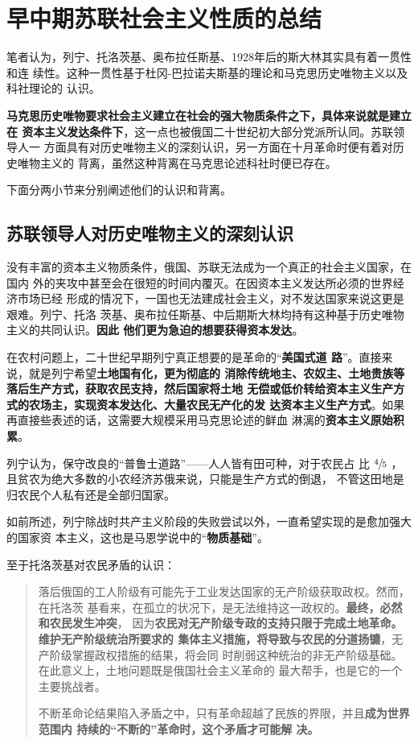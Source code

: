\section{早中期苏联社会主义性质的总结}

笔者认为，列宁、托洛茨基、奥布拉任斯基、1928年后的斯大林其实具有着一贯性和连
续性。这种一贯性基于杜冈-巴拉诺夫斯基的理论和马克思历史唯物主义以及科社理论的
认识。

\textbf{马克思历史唯物要求社会主义建立在社会的强大物质条件之下，具体来说就是建立在
  资本主义发达条件下}，这一点也被俄国二十世纪初大部分党派所认同。苏联领导人一
方面具有对历史唯物主义的深刻认识，另一方面在十月革命时便有着对历史唯物主义的
背离，虽然这种背离在马克思论述科社时便已存在。

下面分两小节来分别阐述他们的认识和背离。

\subsection{苏联领导人对历史唯物主义的深刻认识}

没有丰富的资本主义物质条件，俄国、苏联无法成为一个真正的社会主义国家，在国内
外的夹攻中甚至会在很短的时间内覆灭。在因资本主义发达所必须的世界经济市场已经
形成的情况下，一国也无法建成社会主义，对不发达国家来说这更是艰难。列宁、托洛
茨基、奥布拉任斯基、中后期斯大林均持有这种基于历史唯物主义的共同认识。\textbf{因此
  他们更为急迫的想要获得资本发达}。

在农村问题上，二十世纪早期列宁真正想要的是革命的“\textbf{美国式道
  路}”\cite{chenxintianamerica}。直接来说，就是列宁希望\textbf{土地国有化，更为彻底的
  消除传统地主、农奴主、土地贵族等落后生产方式，获取农民支持，然后国家将土地
  无偿或低价转给资本主义生产方式的农场主，实现资本发达化、大量农民无产化的发
  达资本主义生产方式}。如果再直接些表述的话，这需要大规模采用马克思论述的鲜血
淋漓的\textbf{资本主义原始积累}。

列宁认为，保守改良的“普鲁士道路”——人人皆有田可种，对于农民占
比 $\sfrac{4}{5}$ ，且贫农为绝大多数的小农经济苏俄来说，只能是生产方式的倒退，
不管这田地是归农民个人私有还是全部归国家。

如前所述，列宁除战时共产主义阶段的失败尝试以外，一直希望实现的是愈加强大的国家资
本主义，这也是马恩学说中的“\textbf{物质基础}”。

至于托洛茨基对农民矛盾的认识：
\begin{quotation}
  落后俄国的工人阶级有可能先于工业发达国家的无产阶级获取政权。然而，在托洛茨
  基看来，在孤立的状况下，是无法维持这一政权的。\textbf{最终，必然和农民发生冲突}，
  因为\textbf{农民对无产阶级专政的支持只限于完成土地革命。维护无产阶级统治所要求的
    集体主义措施，将导致与农民的分道扬镳}，无产阶级掌握政权措施的结果，将会同
  时削弱这种统治的非无产阶级基础。在此意义上，土地问题既是俄国社会主义革命的
  最大帮手，也是它的一个主要挑战者。

  不断革命论结果陷入矛盾之中，只有革命超越了民族的界限，并且\textbf{成为世界范围内
    持续的“不断的”革命时，这个矛盾才可能解
    决。}
\end{quotation}

